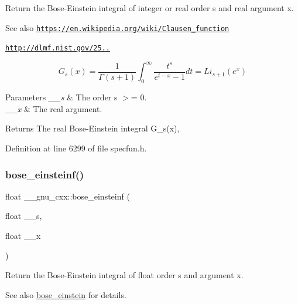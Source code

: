 Return the Bose-\/\+Einstein integral of integer or real order s and real argument x. \begin{DoxySeeAlso}{See also}
\href{https://en.wikipedia.org/wiki/Clausen_function}{\tt https\+://en.\+wikipedia.\+org/wiki/\+Clausen\+\_\+function} 

\href{http://dlmf.nist.gov/25.12.16}{\tt http\+://dlmf.\+nist.\+gov/25..}
\end{DoxySeeAlso}
\[ G_s(x) = \frac{1}{\Gamma(s+1)}\int_0^\infty \frac{t^s}{e^{t-x} - 1}dt = Li_{s+1}(e^x) \]


\begin{DoxyParams}{Parameters}
{\em \+\_\+\+\_\+s} & The order s $>$= 0. \\
\hline
{\em \+\_\+\+\_\+x} & The real argument. \\
\hline
\end{DoxyParams}
\begin{DoxyReturn}{Returns}
The real Bose-\/\+Einstein integral G\+\_\+s(x), 
\end{DoxyReturn}


Definition at line 6299 of file specfun.\+h.

\mbox{\label{group__gnu__math__spec__func_gac1fb313fba5639d4168b6ee682507688}} 
\subsubsection{\texorpdfstring{bose\+\_\+einsteinf()}{bose\_einsteinf()}}
{\footnotesize\ttfamily float \+\_\+\+\_\+gnu\+\_\+cxx\+::bose\+\_\+einsteinf (\begin{DoxyParamCaption}\item[{float}]{\+\_\+\+\_\+s,  }\item[{float}]{\+\_\+\+\_\+x }\end{DoxyParamCaption})\hspace{0.3cm}{\ttfamily [inline]}}

Return the Bose-\/\+Einstein integral of {\ttfamily float} order s and argument x.

\begin{DoxySeeAlso}{See also}
\hyperlink{group__gnu__math__spec__func_gae8135b6861a48f2cee2e692093a17102}{bose\+\_\+einstein} for details. 
\end{DoxySeeAlso}


